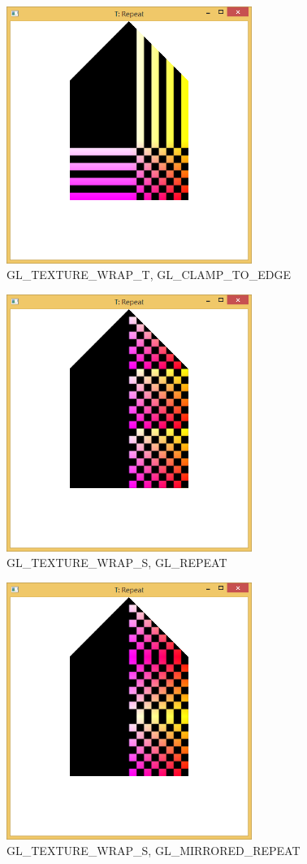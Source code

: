\begin{figure}[hp]
\centering
\includegraphics[width=8cm]{../Screenshots/ex-6/4-3.png}
\caption{GL\_TEXTURE\_WRAP\_T, GL\_CLAMP\_TO\_EDGE}
\label{fig:6-4-3}
\end{figure}


\begin{figure}[hp]
\centering
\includegraphics[width=8cm]{../Screenshots/ex-6/4-5.png}
\caption{GL\_TEXTURE\_WRAP\_S, GL\_REPEAT}
\label{fig:6-4-5}
\end{figure}

\begin{figure}[hp]
\centering
\includegraphics[width=8cm]{../Screenshots/ex-6/4-6.png}
\caption{GL\_TEXTURE\_WRAP\_S, GL\_MIRRORED\_REPEAT}
\label{fig:6-4-6}
\end{figure}


